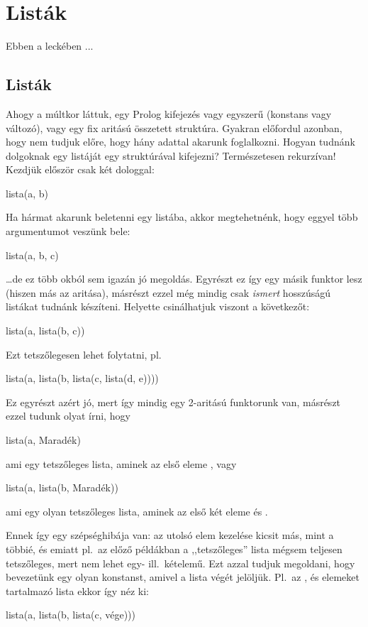 \chapter{Listák}
Ebben a leckében ...
\section{Listák}
Ahogy a múltkor láttuk, egy Prolog kifejezés vagy
egyszerű (konstans vagy változó), vagy egy fix
aritású összetett struktúra. Gyakran előfordul
azonban, hogy nem tudjuk előre, hogy hány adattal
akarunk foglalkozni. Hogyan tudnánk dolgoknak egy
listáját egy struktúrával kifejezni? Természetesen
rekurzívan! Kezdjük először csak két dologgal:
\begin{query}
lista(a, b)
\end{query}
Ha hármat akarunk beletenni egy listába, akkor
megtehetnénk, hogy eggyel több argumentumot veszünk
bele:
\begin{query}
lista(a, b, c)
\end{query}
\dots de ez több okból sem igazán jó
megoldás. Egyrészt ez így egy másik funktor lesz
(hiszen más az aritása), másrészt ezzel még mindig
csak \emph{ismert} hosszúságú listákat tudnánk
készíteni. Helyette csinálhatjuk viszont a
következőt:
\begin{query}
lista(a, lista(b, c))
\end{query}
Ezt tetszőlegesen lehet folytatni, pl.
\begin{query}
lista(a, lista(b, lista(c, lista(d, e))))
\end{query}
Ez egyrészt azért jó, mert így mindig egy 2-aritású
 funktorunk van, másrészt ezzel tudunk
olyat írni, hogy
\begin{query}
lista(a, Maradék)
\end{query}
ami egy tetszőleges lista, aminek az első eleme
, vagy
\begin{query}
lista(a, lista(b, Maradék))
\end{query}
ami egy olyan tetszőleges lista, aminek az első két
eleme  és .

Ennek így egy szépséghibája van: az utolsó elem
kezelése kicsit más, mint a többié, és emiatt pl.~az
előző példákban a ,,tetszőleges'' lista mégsem
teljesen tetszőleges, mert nem lehet egy-
ill.~kételemű. Ezt azzal tudjuk megoldani, hogy
bevezetünk egy olyan konstanst, amivel a lista végét
jelöljük. Pl.~az ,  és  elemeket
tartalmazó lista ekkor így néz ki:
\begin{query}
lista(a, lista(b, lista(c, vége)))
\end{query}

